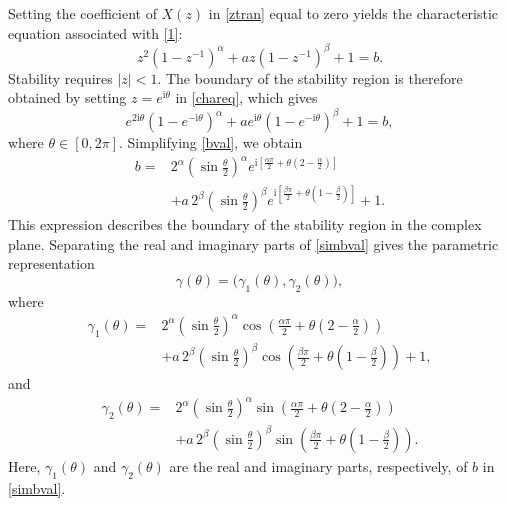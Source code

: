 \documentclass[11pt,a4paper]{article}
\theoremstyle{definition}
\begin{document}
Setting the coefficient of $X(z)$ in \eqref{ztran} equal to zero yields the characteristic equation associated with \eqref{1}:
 \begin{equation}
     z^2(1 - z^{-1})^\alpha + az(1 - z^{-1})^\beta + 1 = b. \label{chareq}
 \end{equation}
 Stability requires $|z| < 1$. The boundary of the stability region is therefore obtained by setting $z = e^{\mathrm{i}\theta}$ in \eqref{chareq}, which gives
 \begin{equation}
     e^{2\mathrm{i}\theta}(1 - e^{-\mathrm{i}\theta})^\alpha
     + ae^{\mathrm{i}\theta}(1 - e^{-\mathrm{i}\theta})^\beta + 1 = b, \label{bval}
 \end{equation}
 where $\theta \in [0,2\pi]$. Simplifying \eqref{bval}, we obtain
 \begin{align}
 b ={}& 2^\alpha\left(\sin\frac{\theta}{2}\right)^\alpha
 e^{\mathrm{i}\left[\frac{\alpha\pi}{2}+\theta\left(2-\frac{\alpha}{2}\right)\right]} \nonumber\\
 &+ a\,2^\beta\left(\sin\frac{\theta}{2}\right)^\beta
 e^{\mathrm{i}\left[\frac{\beta\pi}{2}+\theta\left(1-\frac{\beta}{2}\right)\right]} + 1. \label{simbval}
\end{align}
This expression describes the boundary of the stability region in the complex plane. Separating the real and imaginary parts of \eqref{simbval} gives the parametric representation
 \begin{equation}
     \gamma(\theta) = \bigl(\gamma_1(\theta),\gamma_2(\theta)\bigr), \label{boundarycurve}
 \end{equation}
 where 
\begin{align}
\gamma_1(\theta) ={}& 2^\alpha\left(\sin\frac{\theta}{2}\right)^\alpha
\cos\left(\frac{\alpha\pi}{2}+\theta\left(2-\frac{\alpha}{2}\right)\right) \nonumber\\
&+ a\,2^\beta\left(\sin\frac{\theta}{2}\right)^\beta
\cos\left(\frac{\beta\pi}{2}+\theta\left(1-\frac{\beta}{2}\right)\right) + 1, \label{realpart}
\end{align}
  and
\begin{align}
\gamma_2(\theta) ={}& 2^\alpha\left(\sin\frac{\theta}{2}\right)^\alpha
\sin\left(\frac{\alpha\pi}{2}+\theta\left(2-\frac{\alpha}{2}\right)\right) \nonumber\\
&+ a\,2^\beta\left(\sin\frac{\theta}{2}\right)^\beta
\sin\left(\frac{\beta\pi}{2}+\theta\left(1-\frac{\beta}{2}\right)\right). \label{imgpart}
\end{align}
Here, $\gamma_1(\theta)$ and $\gamma_2(\theta)$ are the real and imaginary parts, respectively, of $b$ in \eqref{simbval}.
\end{document}
